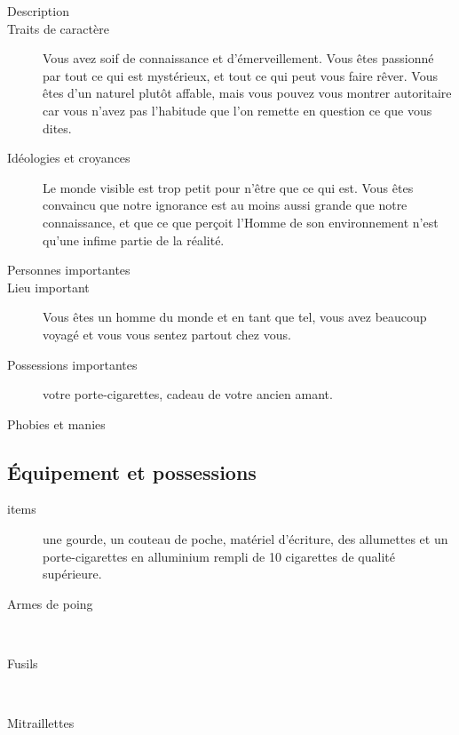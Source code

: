 \documentclass[11pt]{article}
\begin{document}
\begin{twocols}
\begin{description}
\item[{Description}] 

\item[{Traits de caractère}] Vous avez soif de connaissance et d'émerveillement. Vous êtes passionné par tout ce qui est mystérieux, et tout ce qui peut vous faire rêver. Vous êtes d'un naturel plutôt affable, mais vous pouvez vous montrer autoritaire car vous n'avez pas l'habitude que l'on remette en question ce que vous dites.
\item[{Idéologies et croyances}] Le monde visible est trop petit pour n'être que ce qui est. Vous êtes convaincu que notre ignorance est au moins aussi grande que notre connaissance, et que ce que perçoit l'Homme de son environnement n'est qu'une infime partie de la réalité.
\item[{Personnes importantes}] 

\item[{Lieu important}] Vous êtes un homme du monde et en tant que tel, vous avez beaucoup voyagé et vous vous sentez partout chez vous.
\item[{Possessions importantes}] votre porte-cigarettes, cadeau de votre ancien amant.
\item[{Phobies et manies}] 
\end{description}

\subsection{Équipement et possessions}
\label{sec:org1e4fbf5}

\begin{description}
\item[{items}] une gourde, un couteau de poche, matériel d'écriture, des allumettes et un porte-cigarettes en alluminium rempli de 10 cigarettes de qualité supérieure. 
~\\[2em]
\item[{Armes de poing}] ~\\[2em]
\item[{Fusils}] ~\\[2em]
\item[{Mitraillettes}] ~\\[2em]
\end{description}



\end{twocols}
\pagebreak
{}
\end{document}
